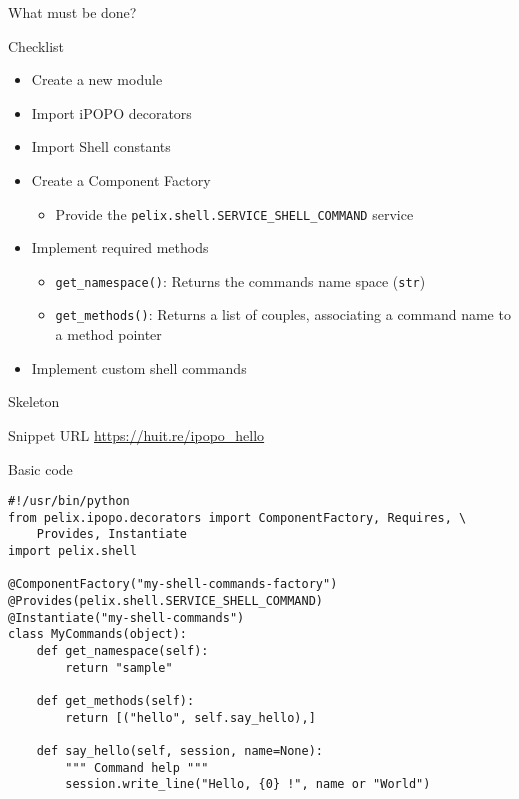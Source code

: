 \begin{frame}{What must be done?}
\begin{block}{Checklist}
\begin{itemize}
\item Create a new module
\item Import iPOPO decorators
\item Import Shell constants
\item Create a Component Factory
\begin{itemize}
\item Provide the \texttt{pelix.shell.SERVICE\_SHELL\_COMMAND} service
\end{itemize}
\item Implement required methods
\begin{itemize}
\item \texttt{get\_namespace()}: Returns the commands name space (\texttt{str})
\item \texttt{get\_methods()}: Returns a list of couples, associating a command name to a method pointer
\end{itemize}
\item Implement custom shell commands
\end{itemize}
\end{block}
\end{frame}

\begin{frame}[fragile]{Skeleton}
\begin{scriptsize}
\begin{exampleblock}{Snippet URL}
\url{https://huit.re/ipopo_hello}
\end{exampleblock}

\begin{block}{Basic code}
\begin{verbatim}
#!/usr/bin/python
from pelix.ipopo.decorators import ComponentFactory, Requires, \
    Provides, Instantiate
import pelix.shell

@ComponentFactory("my-shell-commands-factory")
@Provides(pelix.shell.SERVICE_SHELL_COMMAND)
@Instantiate("my-shell-commands")
class MyCommands(object):
    def get_namespace(self):
        return "sample"

    def get_methods(self):
        return [("hello", self.say_hello),]

    def say_hello(self, session, name=None):
        """ Command help """
        session.write_line("Hello, {0} !", name or "World")
\end{verbatim}
\end{block}
\end{scriptsize}
\end{frame}
